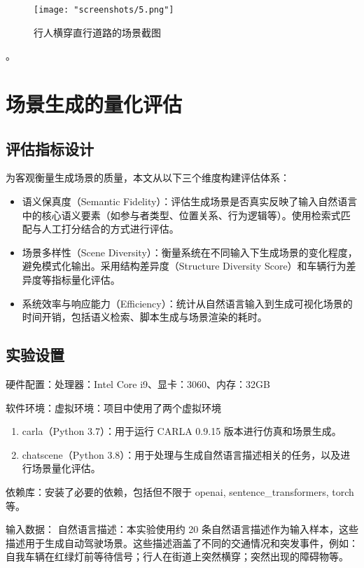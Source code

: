 \documentclass{article}
\begin{document}
\begin{figure}[H]
	\centering
	\texttt{[image: "screenshots/5.png"]}
	\caption{行人横穿直行道路的场景截图}
	\label{fig:pedestrian_crossing}
\end{figure}


。




\section{场景生成的量化评估}

\subsection{评估指标设计}
为客观衡量生成场景的质量，本文从以下三个维度构建评估体系：
\begin{itemize}
	\item 语义保真度（Semantic Fidelity）：评估生成场景是否真实反映了输入自然语言中的核心语义要素（如参与者类型、位置关系、行为逻辑等）。使用检索式匹配与人工打分结合的方式进行评估。
	\item 场景多样性（Scene Diversity）：衡量系统在不同输入下生成场景的变化程度，避免模式化输出。采用结构差异度（Structure Diversity Score）和车辆行为差异度等指标量化评估。
	\item 系统效率与响应能力（Efficiency）：统计从自然语言输入到生成可视化场景的时间开销，包括语义检索、脚本生成与场景渲染的耗时。
\end{itemize}

\subsection{实验设置}
硬件配置：处理器：Intel Core i9、显卡：3060、内存：32GB

软件环境：虚拟环境：项目中使用了两个虚拟环境
\begin{enumerate}
	\item carla（Python 3.7）：用于运行 CARLA 0.9.15 版本进行仿真和场景生成。
	\item chatscene（Python 3.8）：用于处理与生成自然语言描述相关的任务，以及进行场景量化评估。
\end{enumerate}

依赖库：安装了必要的依赖，包括但不限于 openai, sentence\_transformers, torch 等。

输入数据：
自然语言描述：本实验使用约 20 条自然语言描述作为输入样本，这些描述用于生成自动驾驶场景。这些描述涵盖了不同的交通情况和突发事件，例如：自我车辆在红绿灯前等待信号；行人在街道上突然横穿；突然出现的障碍物等。
\end{document}
